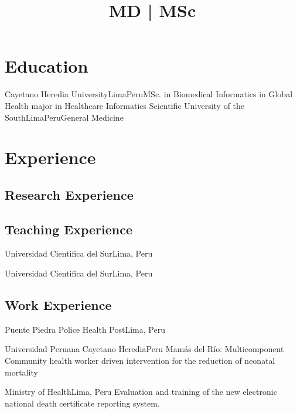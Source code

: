\documentclass[10pt,a4paper,sans]{moderncv}
\title{MD | MSc }
\begin{document}
\makecvtitle

\section{Education}

{Cayetano Heredia University}{Lima}{Peru}{MSc. in Biomedical Informatics in Global Health major in Healthcare Informatics}
{Scientific University of the South}{Lima}{Peru}{General Medicine}  

\section{Experience}
    \subsection{Research Experience}
        
        


    \subsection{Teaching Experience}
        {Universidad Cientifica del Sur}{Lima, Peru}{}{}
        
        {Universidad Cientifica del Sur}{Lima, Peru}{}{}

        
    \subsection{Work Experience}
        {Puente Piedra Police Health Post}{Lima, Peru}{}{}
        
        {Universidad Peruana Cayetano Heredia}{Peru}{}
        {Mamás del Río: Multicomponent Community health worker driven intervention for the reduction of neonatal mortality}
        
        {Ministry of Health}{Lima, Peru}{}
        {Evaluation and training of the new electronic national death certificate reporting system.} 
        
\end{document}
